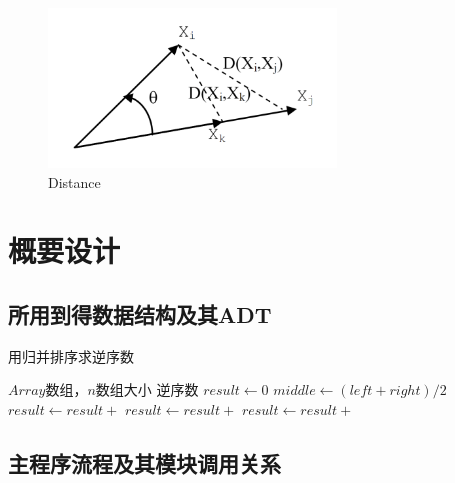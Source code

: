 \documentclass[a4paper]{article}
\begin{document}
    \begin{figure}[htbp]
        \centering
        \includegraphics[height=120pt]{D}
        \caption{Distance}\label{fig:figure2}
    \end{figure}



    \section{概要设计}\label{sec:design1}

    \subsection{所用到得数据结构及其ADT}\label{subsec:adt}
    \begin{algorithm}
        \caption{用归并排序求逆序数}
        \begin{algorithmic}[1] %
            \Require $Array$数组，$n$数组大小
            \Ensure 逆序数
                \State $result \gets 0$
                    \State $middle \gets (left + right) / 2$
                    \State $result \gets result +$ 
                    \State $result \gets result +$ 
                    \State $result \gets result +$ 
                \EndIf
                \State {}
            \EndFunction
        \end{algorithmic}\label{alg:algorithm}
    \end{algorithm}

    \subsection{主程序流程及其模块调用关系}\label{subsec:relate}
\end{document}
